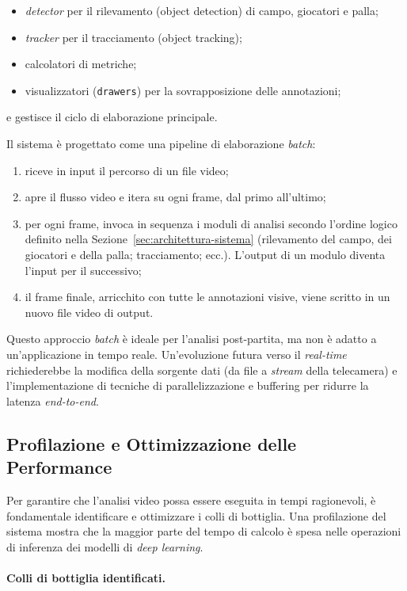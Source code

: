 \documentclass[12pt,a4paper,openright,twoside]{book}
\begin{document}
\begin{itemize}
  \item \emph{detector} per il rilevamento (object detection) di campo, giocatori e palla;
  \item \emph{tracker} per il tracciamento (object tracking);
  \item calcolatori di metriche;
  \item visualizzatori (\texttt{drawers}) per la sovrapposizione delle annotazioni;
\end{itemize}
e gestisce il ciclo di elaborazione principale.

\noindent Il sistema è progettato come una pipeline di elaborazione \emph{batch}:
\begin{enumerate}
  \item riceve in input il percorso di un file video;
  \item apre il flusso video e itera su ogni frame, dal primo all'ultimo;
  \item per ogni frame, invoca in sequenza i moduli di analisi secondo l'ordine logico definito nella Sezione~\ref{sec:architettura-sistema} 
  (rilevamento del campo, dei giocatori e della palla; tracciamento; ecc.). L'output di un modulo diventa l'input per il successivo;
  \item il frame finale, arricchito con tutte le annotazioni visive, viene scritto in un nuovo file video di output.
\end{enumerate}

Questo approccio \emph{batch} è ideale per l'analisi post-partita, ma non è adatto a un'applicazione in tempo reale. Un'evoluzione futura 
verso il \emph{real-time} richiederebbe la modifica della sorgente dati (da file a \emph{stream} della telecamera) e l'implementazione di tecniche 
di parallelizzazione e buffering per ridurre la latenza \emph{end-to-end}.

\subsection{Profilazione e Ottimizzazione delle Performance}
\label{sec:profilazione-ottimizzazione}

Per garantire che l'analisi video possa essere eseguita in tempi ragionevoli, è fondamentale identificare e ottimizzare i colli 
di bottiglia. Una profilazione del sistema mostra che la maggior parte del tempo di calcolo è spesa nelle operazioni di inferenza 
dei modelli di \emph{deep learning}.

\paragraph{Colli di bottiglia identificati.}
\end{document}
